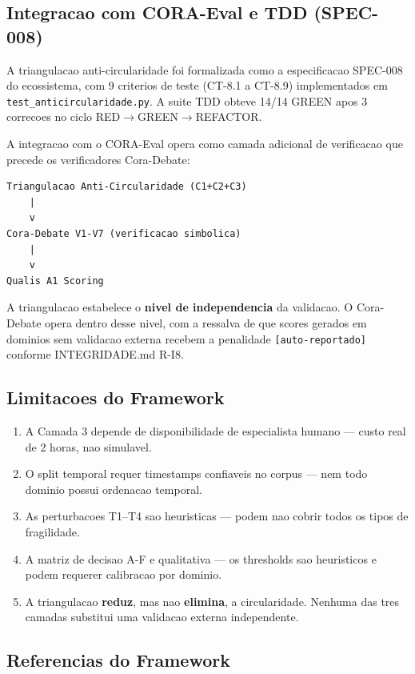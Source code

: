\subsection{Integracao com CORA-Eval e TDD (SPEC-008)}

A triangulacao anti-circularidade foi formalizada como a especificacao
SPEC-008 do ecossistema, com 9 criterios de teste (CT-8.1 a CT-8.9)
implementados em \texttt{test\_anticircularidade.py}. A suite TDD obteve
14/14 GREEN apos 3 correcoes no ciclo RED$\to$GREEN$\to$REFACTOR.

A integracao com o CORA-Eval opera como camada adicional de verificacao
que precede os verificadores Cora-Debate:

\begin{verbatim}
Triangulacao Anti-Circularidade (C1+C2+C3)
    |
    v
Cora-Debate V1-V7 (verificacao simbolica)
    |
    v
Qualis A1 Scoring
\end{verbatim}

A triangulacao estabelece o \textbf{nivel de independencia} da validacao.
O Cora-Debate opera dentro desse nivel, com a ressalva de que scores
gerados em dominios sem validacao externa recebem a penalidade
\texttt{[auto-reportado]} conforme INTEGRIDADE.md R-I8.

\subsection{Limitacoes do Framework}

\begin{enumerate}[label=(\roman*)]
\item A Camada 3 depende de disponibilidade de especialista humano — custo
      real de 2 horas, nao simulavel.
\item O split temporal requer timestamps confiaveis no corpus — nem todo
      dominio possui ordenacao temporal.
\item As perturbacoes T1--T4 sao heuristicas — podem nao cobrir todos os
      tipos de fragilidade.
\item A matriz de decisao A-F e qualitativa — os thresholds sao heuristicos
      e podem requerer calibracao por dominio.
\item A triangulacao \textbf{reduz}, mas nao \textbf{elimina}, a
      circularidade. Nenhuma das tres camadas substitui uma validacao
      externa independente.
\end{enumerate}

\subsection{Referencias do Framework}

